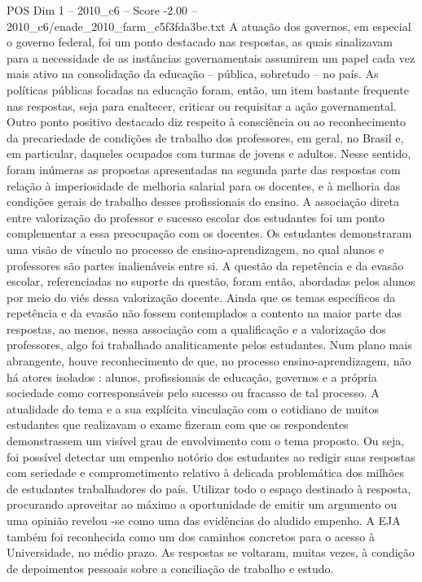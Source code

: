 \begin{textsample}{POS Dim 1 – 2010\_c6 – Score -2.00 – 2010\_c6/enade\_2010\_farm\_c5f3fda3be.txt}
A atuação dos governos, em especial o governo federal, foi um ponto destacado nas respostas, as quais sinalizavam para a necessidade de as instâncias governamentais assumirem um papel cada vez mais ativo na consolidação da educação – pública, sobretudo – no país.
As políticas públicas focadas na educação foram, então, um item bastante frequente nas respostas, seja para enaltecer, criticar ou requisitar a ação governamental.
Outro ponto positivo destacado diz respeito à consciência ou ao reconhecimento da precariedade de condições de trabalho dos professores, em geral, no Brasil e, em particular, daqueles ocupados com turmas de jovens e adultos.
Nesse sentido, foram inúmeras as propostas apresentadas na segunda parte das respostas com relação à imperiosidade de melhoria salarial para os docentes, e à melhoria das condições gerais de trabalho desses profissionais do ensino.
A associação direta entre valorização do professor e sucesso escolar dos estudantes foi um ponto complementar a essa preocupação com os docentes.
Os estudantes demonstraram uma visão de vínculo no processo de ensino-aprendizagem, no qual alunos e professores são partes inalienáveis entre si.
A questão da repetência e da evasão escolar, referenciadas no suporte da questão, foram então, abordadas pelos alunos por meio do viés dessa valorização docente.
Ainda que os temas específicos da repetência e da evasão não fossem contemplados a contento na maior parte das respostas, ao menos, nessa associação com a qualificação e a valorização dos professores, algo foi trabalhado analiticamente pelos estudantes.
Num plano mais abrangente, houve reconhecimento de que, no processo ensino-aprendizagem, não há atores isolados : alunos, profissionais de educação, governos e a própria sociedade como corresponsáveis pelo sucesso ou fracasso de tal processo.
A atualidade do tema e a sua explícita vinculação com o cotidiano de muitos estudantes que realizavam o exame fizeram com que os respondentes demonstrassem um visível grau de envolvimento com o tema proposto.
Ou seja, foi possível detectar um empenho notório dos estudantes ao redigir suas respostas com seriedade e comprometimento relativo à delicada problemática dos milhões de estudantes trabalhadores do país.
Utilizar todo o espaço destinado à resposta, procurando aproveitar ao máximo a oportunidade de emitir um argumento ou uma opinião revelou -se como uma das evidências do aludido empenho.
A EJA também foi reconhecida como um dos caminhos concretos para o acesso à Universidade, no médio prazo.
As respostas se voltaram, muitas vezes, à condição de depoimentos pessoais sobre a conciliação de trabalho e estudo.

\end{textsample}
